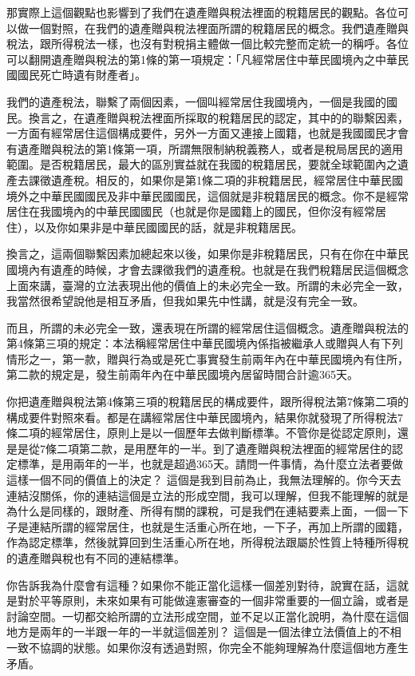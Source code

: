 \documentclass[oneside,sub3section]{ctexbook}
\begin{document}
那實際上這個觀點也影響到了我們在遺產贈與稅法裡面的稅籍居民的觀點。各位可以做一個對照，在我們的遺產贈與稅法裡面所謂的稅籍居民的概念。我們遺產贈與稅法，跟所得稅法一樣，也沒有對稅捐主體做一個比較完整而定統一的稱呼。各位可以翻開遺產贈與稅法的第1條的第一項規定：「凡經常居住中華民國境內之中華民國國民死亡時遺有財產者」。

我們的遺產稅法，聯繫了兩個因素，一個叫經常居住我國境內，一個是我國的國民。換言之，在遺產贈與稅法裡面所採取的稅籍居民的認定，其中的的聯繫因素，一方面有經常居住這個構成要件，另外一方面又連接上國籍，也就是我國國民才會有遺產贈與稅法的第1條第一項，所謂無限制納稅義務人，或者是稅局居民的適用範圍。是否稅籍居民，最大的區別實益就在我國的稅籍居民，要就全球範圍內之遺產去課徵遺產稅。相反的，如果你是第1條二項的非稅籍居民，經常居住中華民國境外之中華民國國民及非中華民國國民，這個就是非稅籍居民的概念。你不是經常居住在我國境內的中華民國國民（也就是你是國籍上的國民，但你沒有經常居住），以及你如果非是中華民國國民的話，就是非稅籍居民。

換言之，這兩個聯繫因素加總起來以後，如果你是非稅籍居民，只有在你在中華民國境內有遺產的時候，才會去課徵我們的遺產稅。也就是在我們稅籍居民這個概念上面來講，臺灣的立法表現出他的價值上的未必完全一致。所謂的未必完全一致，我當然很希望說他是相互矛盾，但我如果先中性講，就是沒有完全一致。

而且，所謂的未必完全一致，還表現在所謂的經常居住這個概念。遺產贈與稅法的第4條第三項的規定：本法稱經常居住中華民國境內係指被繼承人或贈與人有下列情形之一，第一款，贈與行為或是死亡事實發生前兩年內在中華民國境內有住所，第二款的規定是，發生前兩年內在中華民國境內居留時間合計逾365天。

你把遺產贈與稅法第4條第三項的稅籍居民的構成要件，跟所得稅法第7條第二項的構成要件對照來看。都是在講經常居住中華民國境內，結果你就發現了所得稅法7條二項的經常居住，原則上是以一個歷年去做判斷標準。不管你是從認定原則，還是是從7條二項第二款，是用歷年的一半。到了遺產贈與稅法裡面的經常居住的認定標準，是用兩年的一半，也就是超過365天。請問一件事情，為什麼立法者要做這樣一個不同的價值上的決定？ 這個是我到目前為止，我無法理解的。你今天去連結沒關係，你的連結這個是立法的形成空間，我可以理解，但我不能理解的就是為什么是同樣的，跟財產、所得有關的課稅，可是我們在連結要素上面，一個一下子是連結所謂的經常居住，也就是生活重心所在地，一下子，再加上所謂的國籍，作為認定標準，然後就算回到生活重心所在地，所得稅法跟屬於性質上特種所得稅的遺產贈與稅也有不同的連結標準。

你告訴我為什麼會有這種？如果你不能正當化這樣一個差別對待，說實在話，這就是對於平等原則，未來如果有可能做違憲審查的一個非常重要的一個立論，或者是討論空間。一切都交給所謂的立法形成空間，並不足以正當化說明，為什麼在這個地方是兩年的一半跟一年的一半就這個差別？ 這個是一個法律立法價值上的不相一致不協調的狀態。如果你沒有透過對照，你完全不能夠理解為什麼這個地方產生矛盾。
\end{document}
